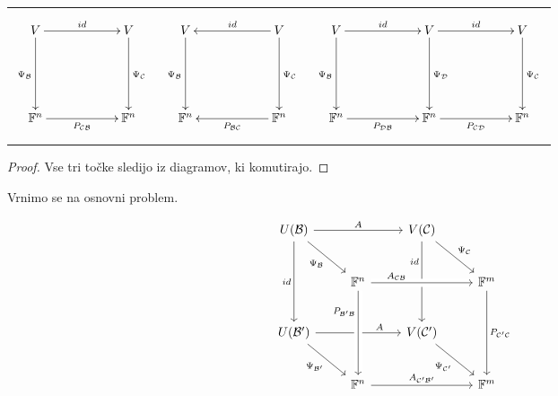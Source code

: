 \documentclass[10pt, a4paper]{article}
\newenvironment{noticeC}{%
  \tcolorbox[%
  notitle,
  empty,
  enhanced,  %
  breakable,
  coltext=black, 
  fontupper=\rmfamily,
  parbox=false,
  noparskip,
  sharp corners,
  boxrule=-1pt,  %
  frame hidden,
  left=7pt,  %
  right=7pt,
  top=5pt,
  bottom=5pt,
  before skip=2.5ex plus 2pt,
  after skip=2.5ex plus 2pt,
  overlay unbroken and last={%
  },
  ]}
{\endtcolorbox}
\newenvironment{dokaz}%
  {\begin{noticeC}\begin{proof}}%
  {\end{proof}\end{noticeC}}
\newcommand{\F}{\mathbb {F}}
\begin{document}
\begin{center}
    \begin{tabular}{ccc}
    \begin{minipage}{3.85cm}
        \begin{displaymath}
            \xymatrixrowsep{2cm}
            \xymatrixcolsep{2cm}
            \xymatrix{ V \ar[r]^{id} \ar[d]_{\Psi_\mathcal{B}} & V \ar[d]^{\Psi_\mathcal{C}} \\
                        \F^n \ar[r]_{P_\mathcal{CB}} & \F^n}
        \end{displaymath}
    \end{minipage}
    &
    \begin{minipage}{3.85cm}
        \begin{displaymath}
            \xymatrixrowsep{2cm}
            \xymatrixcolsep{2cm}
            \xymatrix{ V \ar[d]_{\Psi_\mathcal{B}} & V \ar[d]^{\Psi_\mathcal{C}} \ar[l]_{id}\\
                        \F^n & \F^n \ar[l]^{P_\mathcal{BC}}}
        \end{displaymath}
    \end{minipage}
    &
    \begin{minipage}{6.7cm}
        \begin{displaymath}
            \xymatrixrowsep{2cm}
            \xymatrixcolsep{2cm}
            \xymatrix{ V \ar[r]^{id} \ar[d]_{\Psi_\mathcal{B}} & V \ar[d]^{\Psi_\mathcal{D}} \ar[r]^{id} & V \ar[d]^{\Psi_\mathcal{C}}\\
                        \F^n \ar[r]_{P_\mathcal{DB}} & \F^n \ar[r]_{P_\mathcal{CD}} & \F^n}
        \end{displaymath}
    \end{minipage}
    \end{tabular}
\end{center}


\begin{dokaz}
    Vse tri točke sledijo iz diagramov, ki komutirajo.
\end{dokaz}

Vrnimo se na osnovni problem. 

\[
\begin{tikzcd}[row sep=2.5em]
U(\mathcal{B}) \arrow[rr,"A"] \arrow[dr,swap,"\Psi_\mathcal{B}"] \arrow[dd,swap,"id"] &&
  V(\mathcal{C}) \arrow[dd,swap,"id" near start] \arrow[dr,"\Psi_\mathcal{C}"] \\
& \F^n \arrow[rr,crossing over,"A_\mathcal{CB}" near start] &&
  \F^m \arrow[dd,"P_\mathcal{C'C}"] \\
U(\mathcal{B'}) \arrow[rr,"A" near end] \arrow[dr,swap,"\Psi_\mathcal{B'}"] && V(\mathcal{C'}) \arrow[dr,swap,"\Psi_\mathcal{C'}"] \\
& \F^n \arrow[rr,"A_\mathcal{C'B'}"] \arrow[uu,<-,crossing over,"P_\mathcal{B'B}" near end]&& \F^m
\end{tikzcd}
\]
    
\end{document}
